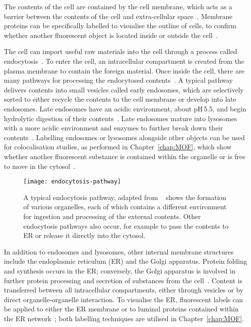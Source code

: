 The contents of the cell are contained by the cell membrane, which acts as a barrier between the contents of the cell and extra-cellular space~\cite{alberts2013essential}. 
Membrane proteins can be specifically labelled to visualise the outline of cells, to confirm whether another fluorescent object is located inside or outside the cell~\cite{yano2009tag, lee2011fluorescent, chamma2017optimized}. 

The cell can import useful raw materials into the cell through a process called endocytosis~\cite{alberts2002molecular}. 
To enter the cell, an intracellular compartment is created from the plasma membrane to contain the foreign material.
Once inside the cell, there are many pathways for processing the endocytosed contents~\cite{marsh2001endocytosis, marsh1999structural, mcmahon2011molecular}. 
A typical pathway delivers contents into small vesicles called early endosomes, which are selectively sorted to either recycle the contents to the cell membrane or develop into late endosomes. 
Late endosomes have an acidic environment, about pH\,\num{5.5}, and begin hydrolytic digestion of their contents~\cite{geisow1984ph}. 
Late endosomes mature into lysosomes with a more acidic environment and enzymes to further break down their contents~\cite{alberts2002molecular}. 
Labelling endosomes or lysosomes alongside other objects can be used for colocalisation studies, as performed in Chapter~\ref{chap:MOF}, which show whether another fluorescent substance is contained within the organelle or is free to move in the cytosol~\cite{pike2017quantifying}. 

\begin{figure}[htbp!]
\centering
\texttt{[image: endocytosis-pathway]}
\captionsetup{singlelinecheck=off}
\caption[Introduction: Cells import external contents through endocytosis]{A typical endocytosis pathway, adapted from ~\cite{alberts2002molecular} shows the formation of various organelles, each of which contains a different environment for ingestion and processing of the external contents. Other endocytosis pathways also occur, for example to pass the contents to ER or release it directly into the cytosol. }
\label{fig:endocytosis-pathway}
\end{figure}

In addition to endosomes and lysosomes, other internal membrane structures include the endoplasmic reticulum (ER) and the Golgi apparatus. 
Protein folding and synthesis occurs in the ER; conversely, the Golgi apparatus is involved in further protein processing and secretion of substances from the cell~\cite{dyson1978cell}. 
Content is transferred between all intracellular compartments, either through vesicles or by direct organelle-organelle interaction. 
To visualise the ER, fluorescent labels can be applied to either the ER membrane or to luminal proteins contained within the ER network~\cite{costantini2013probing}; both labelling techniques are utilised in Chapter~\ref{chap:MOF}.  


